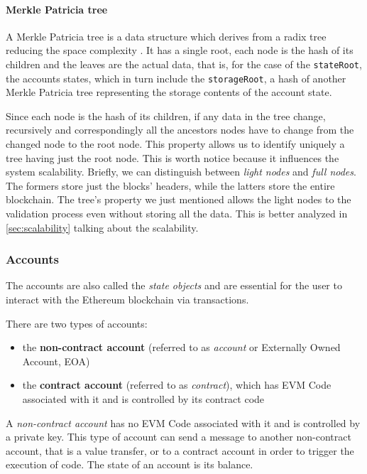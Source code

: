 \paragraph{Merkle Patricia tree} A Merkle Patricia tree is a data structure
which derives from a radix tree reducing the space complexity
\cite{patriciatree}. It has a single root, each node is the hash of its children
and the leaves are the actual data, that is, for the case of the
\verb+stateRoot+, the accounts states, which in turn include the
\verb+storageRoot+, a hash of another Merkle Patricia tree representing the
storage contents of the account state.

Since each node is the hash of its children, if any data in the tree change,
recursively and correspondingly all the ancestors nodes have to change from the
changed node to the root node. This property allows us to identify uniquely a
tree having just the root node. This is worth notice because it influences
the system scalability. Briefly, we can distinguish between \emph{light nodes}
and \emph{full nodes}. The formers store just the blocks' headers, while the
latters store the entire blockchain. The tree's property we just mentioned
allows the light nodes to the validation process even without storing all the
data. This is better analyzed in \autoref{sec:scalability} talking about the
scalability.

\subsubsection{Accounts}
\label{sec:accounts}

The accounts are also called the \emph{state objects} and are essential for the
user to interact with the Ethereum blockchain via transactions.

There are two types of accounts:

\begin{itemize}
  \item the \textbf{non-contract account} (referred to as \emph{account} or
  Externally Owned Account, EOA)
  \item the \textbf{contract account} (referred to as \emph{contract}), which
  has EVM Code associated with it and is controlled by its contract code
\end{itemize}

A \emph{non-contract account} has no EVM Code associated with it and is
controlled by a private key. This type of account can send a message to another
non-contract account, that is a value transfer, or to a contract account in
order to trigger the execution of code. The state of an account is its balance.

